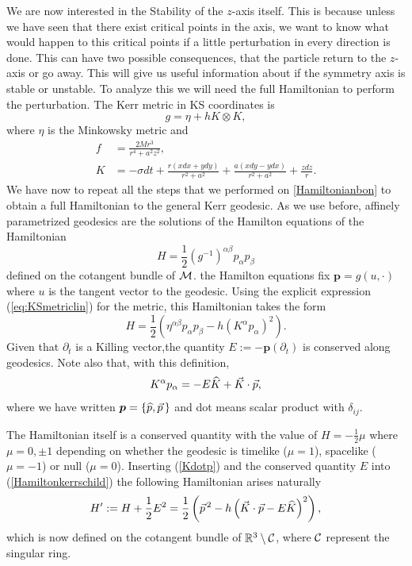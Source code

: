 We are now interested in the Stability of the $z$-axis itself. This is because unless we have seen that there exist critical points in the axis, we want to know what would happen to this critical points if a little perturbation in every direction is done. This can have two possible consequences, that the particle return to the $z$-axis or go away. This will give us useful information about if the symmetry axis is stable or unstable. To analyze this we will need the full Hamiltonian to perform the perturbation. The Kerr metric in \gls{KS} coordinates is
\begin{equation}\label{eq:KSmetriclin}
 g=\eta + h K \otimes K,
\end{equation}
where $\eta$ is the Minkowsky metric and
\begin{align}
 f&=\frac{2 M r^3}{r^4+a^2 z^2}, \nonumber \\
 K&=-\sigma dt + \frac{r(x dx+y dy)}{r^2+a^2} + \frac{a(x dy-y dx)}{r^2+a^2}+\frac{z dz}{r}. \nonumber
\end{align}
We have now to repeat all the steps that we performed on \cref{Hamiltonianbon} to obtain a full Hamiltonian to the general Kerr geodesic. As we use before, affinely parametrized geodesics are the solutions of the Hamilton equations of the Hamiltonian
\begin{equation}
H=\frac{1}{2}(g^{-1})^{\alpha \beta} p_\alpha p_\beta
\end{equation}
defined on the cotangent bundle of ${\mathcal M}$. the Hamilton equations fix $\bm{p}= g (u, \cdot)$ where $u$ is  the tangent vector to the geodesic. Using  the explicit expression (\ref{eq:KSmetriclin}) for the metric, this Hamiltonian takes the form
\begin{equation}
H= \frac{1}{2} \left(
\eta^{\alpha \beta} p_\alpha p_\beta -  h (K^\alpha p_\alpha)^2
\right).
\end{equation}
Given that $\partial_t$ is a Killing vector,the quantity $E := - \bm{p} (\partial_t)$ is conserved along geodesics.
Note also that, with this definition,
\begin{equation}
K^{\alpha} p_{\alpha} = - E \widehat{K} + \vec{K} \cdot \vec{p},
\end{equation}
where we have written $\mbox{\boldmath $p$} = \{ \widehat{p},
\vec{p} \, \}$ and dot means scalar product with $\delta_{ij}$.

The Hamiltonian itself is a conserved quantity with the value of
$H=-\frac{1}{2} \mu$ where $\mu= {0,\pm 1}$ depending on whether the
geodesic is timelike ($\mu=1$), spacelike ($\mu=-1$) or null
($\mu=0$). Inserting (\ref{Kdotp}) and the conserved quantity $E$
into (\ref{Hamiltonkerrschild})
the following Hamiltonian arises naturally
\begin{equation}\label{FinalgeneralH}
H^{\prime} := H + \frac{1}{2} E^2 = 
\frac{1}{2} \left( \vec{p}^{\,2}- h \left( \vec{K} \cdot \vec{p} - E 
\widehat{K} \right)^2 \right),
\end{equation} 
which is now defined on the cotangent 
bundle of $\mathbb{R}^{3} \setminus {\mathcal C}$, where ${\mathcal C}$ represent the singular ring. 

